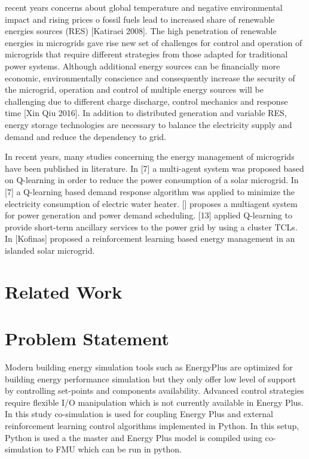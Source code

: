 \documentclass[journal]{IEEEtran}
\begin{document}
 recent years concerns about global temperature and negative environmental
  impact and rising prices o fossil fuels lead to increased share of renewable
  energies sources (RES) [Katiraei 2008]. The high penetration of renewable energies in microgrids gave rise
  new set of challenges for control and operation of microgrids that require
  different strategies from those adapted for traditional power systems. Although
  additional energy sources can be financially more economic, environmentally conscience
  and consequently increase the security of the microgrid, operation and control
  of multiple energy sources will be challenging due to different charge discharge,
  control mechanics and response time [Xin Qiu 2016]. In addition to distributed generation
   and variable RES,  energy storage technologies are necessary to balance the electricity
   supply and demand and reduce the dependency to grid.

   In recent years, many studies concerning the energy management of microgrids have been published in literature. In [7] a multi-agent system was proposed based on Q-learning in order to reduce the power
   consumption of a solar microgrid. In [7] a Q-learning based demand response algorithm was applied to minimize the electricity consumption of electric water heater. [] proposes a multiagent system for power generation and power demand scheduling. [13]  applied Q-learning to provide short-term ancillary services to the power grid by using a cluster TCLs. In [Kofinas] proposed a reinforcement learning based energy management in an islanded solar microgrid.


\section{Related Work}


\section{Problem Statement}

Modern building energy simulation tools such as EnergyPlus are optimized
for building energy performance simulation but they only offer low level
of support by controlling set-points and components availability.
Advanced control strategies require flexible I/O manipulation which is
not currently available in Energy Plus. In this study co-simulation is
used for coupling Energy Plus and external reinforcement learning
control algorithms implemented in Python. In this setup, Python is used
a the master and Energy Plus model is compiled using co-simulation to
FMU which can be run in python.
\end{document}
